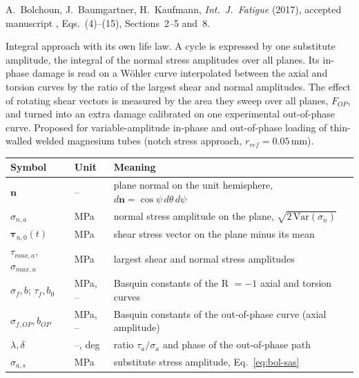 \label{sheet:BOLCHOUN}

 A.~Bolchoun, J.~Baumgartner, H.~Kaufmann, \emph{Int.\ J.\ Fatigue} (2017),
accepted manuscript \cite{bolchoun2017}, Eqs.~(4)--(15), Sections~2--5 and~8.

 Integral approach with its own life law. A cycle is expressed by one
substitute amplitude, the integral of the normal stress amplitudes over all planes. Its in-phase
damage is read on a W\"ohler curve interpolated between the axial and torsion curves by the ratio
of the largest shear and normal amplitudes. The effect of rotating shear vectors is measured by
the area they sweep over all planes, $F_{OP}$, and turned into an extra damage calibrated on one
experimental out-of-phase curve. Proposed for variable-amplitude in-phase and out-of-phase
loading of thin-walled welded magnesium tubes (notch stress approach, $r_{ref}=0.05$\,mm).

\begin{center}\small
\begin{tabular}{@{}llp{100mm}@{}}
\toprule
Symbol & Unit & Meaning\\\midrule
$\mathbf n$ & -- & plane normal on the unit hemisphere, $d\mathbf n=\cos\psi\,d\theta\,d\psi$\\
$\sigma_{n,a}$ & MPa & normal stress amplitude on the plane, $\sqrt{2\,\mathrm{Var}(\sigma_n)}$\\
$\boldsymbol\tau_{n,0}(t)$ & MPa & shear stress vector on the plane minus its mean\\
$\tau_{max,a}$, $\sigma_{max,a}$ & MPa & largest shear and normal stress amplitudes\\
$\sigma_f,b$; $\tau_f,b_0$ & MPa, -- & Basquin constants of the R $=-1$ axial and torsion curves\\
$\sigma_{f,OP},b_{OP}$ & MPa, -- & Basquin constants of the out-of-phase curve (axial amplitude)\\
$\lambda,\delta$ & --, deg & ratio $\tau_a/\sigma_a$ and phase of the out-of-phase path\\
$\sigma_{a,s}$ & MPa & substitute stress amplitude, Eq.~\eqref{eq:bol-sas}\\
\bottomrule
\end{tabular}
\end{center}

